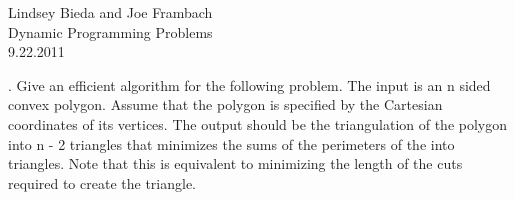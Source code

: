 \documentclass[10pt]{article}
\begin{document}
	\begin{flushright}
	Lindsey Bieda and Joe Frambach\\
	Dynamic Programming Problems\\
	9.22.2011
	\end{flushright}
	.  Give an efficient algorithm for the following problem. The input is an n sided convex polygon. Assume
			that the polygon is specified by the Cartesian coordinates of its vertices.  The output should be the
			triangulation of the polygon into n - 2 triangles that minimizes the sums of the perimeters of the
			into triangles. Note that this is equivalent to minimizing the length of the cuts required to create the
			triangle.
\end{document}
